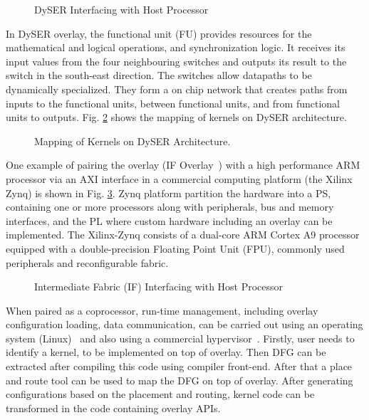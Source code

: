 \begin{figure}[!h]
	\centering
	\caption{DySER Interfacing with Host Processor~\cite{govindaraju2012dyser}} %
	\label{dyser_host}
\end{figure}

In DySER overlay, the functional unit (FU) provides resources for the mathematical and logical operations, and synchronization logic.
It receives its input values from the four neighbouring switches and outputs its result to the switch in the south-east direction.
The switches allow datapaths to be dynamically specialized. 
They form a on chip network that creates paths from inputs to the functional units, between functional units, and from functional units to outputs.
Fig. \ref{dyser_kernel} shows the mapping of kernels on DySER architecture.

\begin{figure}[!h]
	\centering
	\caption{Mapping of Kernels on DySER Architecture.}
	\label{dyser_kernel}
\end{figure}

One example of pairing the overlay (\ac{IF} Overlay~\cite{coole_intermediate_2010}) with a high performance ARM processor via an \ac{AXI} interface in a commercial computing platform (the Xilinx Zynq\cite{xilinx_zynq_2013}) is shown in Fig. \ref{jsps}.
Zynq platform partition the hardware into a \ac{PS}, containing one or more processors along with peripherals, bus and memory interfaces, and the \ac{PL} where custom hardware including an overlay can be implemented. 
The Xilinx-Zynq consists of a dual-core ARM Cortex A9 processor equipped with a double-precision Floating Point Unit (FPU), commonly used peripherals and reconfigurable fabric.


\begin{figure}[!h]
	\centering
	\caption{Intermediate Fabric (IF) Interfacing with Host Processor~\cite{jsps2014-jain}} %
	\label{jsps}
\end{figure}

When paired as a coprocessor, run-time management, including overlay configuration loading, data communication, can be carried out using an operating system (Linux)~\cite{cong2014fully} and also using a commercial hypervisor~\cite{pham_microkernel_2013}.
Firstly, user needs to identify a kernel, to be implemented on top of overlay.
Then DFG can be extracted after compiling this code using compiler front-end.
After that a place and route tool can be used to map the DFG on top of overlay.
After generating configurations based on the placement and routing, kernel code can be transformed in the code containing overlay APIs. 


